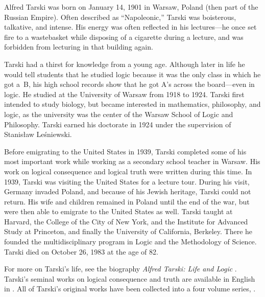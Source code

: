 \documentclass[../../../include/open-logic-section]{subfiles}
\begin{document}



Alfred Tarski was born on January 14, 1901 in Warsaw, Poland (then
part of the Russian Empire). Often described as ``Napoleonic,'' Tarski
was boisterous, talkative, and intense.  His energy was often reflected
in his lectures---he once set fire to a wastebasket while disposing of
a cigarette during a lecture, and was forbidden from lecturing in that
building again.

Tarski had a thirst for knowledge from a young age. Although later in
life he would tell students that he studied logic because it was the
only class in which he got a~B, his high school records show that he
got A's across the board---even in logic. He studied at the University
of Warsaw from 1918 to 1924. Tarski first intended to study
biology, but became interested in mathematics, philosophy, and logic,
as the university was the center of the Warsaw School of Logic and
Philosophy. Tarski earned his doctorate in 1924 under the supervision of
Stanis\l{}aw Le\'{s}niewski.

Before emigrating to the United States in 1939, Tarski completed some
of his most important work while working as a secondary school teacher
in Warsaw. His work on logical consequence and logical truth were
written during this time. In 1939, Tarski was visiting the United
States for a lecture tour. During his visit, Germany invaded Poland,
and because of his Jewish heritage, Tarski could not return.  His wife
and children remained in Poland until the end of the war, but were
then able to emigrate to the United States as well.  Tarski taught at
Harvard, the College of the City of New York, and the Institute for
Advanced Study at Princeton, and finally the University of California,
Berkeley. There he founded the multidisciplinary program in Logic and
the Methodology of Science.  Tarski died on October 26, 1983 at the
age of 82.

\begin{reading} 
For more on Tarski's life, see the biography \emph{Alfred Tarski: Life
  and Logic} \citep{Feferman2004}. Tarski's seminal works on logical
consequence and truth are available in English in \citep{Tarski1983}.
All of Tarski's original works have been collected into a four volume
series, \citep{Tarski1981}.
\end{reading}
\end{document}
